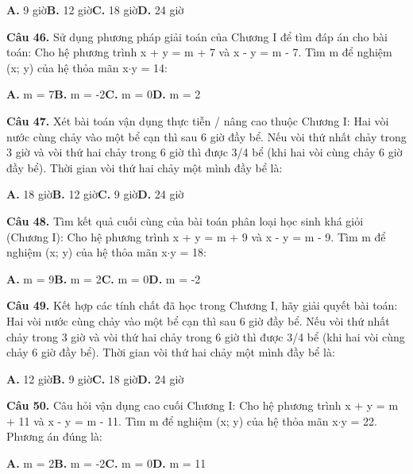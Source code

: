 \documentclass[11pt,a4paper]{article}
\begin{document}
\hspace*{1.5em}\textbf{A.} 9 giờ\quad\quad \textbf{B.} 12 giờ\quad\quad \textbf{C.} 18 giờ\quad\quad \textbf{D.} 24 giờ\par\vspace{2pt}
\textbf{\color{primary} Câu 46.} Sử dụng phương pháp giải toán của Chương I để tìm đáp án cho bài toán: Cho hệ phương trình x + y = m + 7 và x - y = m - 7. Tìm m để nghiệm (x; y) của hệ thỏa mãn x$\cdot$y = 14:\par
\hspace*{1.5em}\textbf{A.} m = 7\quad\quad \textbf{B.} m = -2\quad\quad \textbf{C.} m = 0\quad\quad \textbf{D.} m = 2\par\vspace{2pt}
\textbf{\color{primary} Câu 47.} Xét bài toán vận dụng thực tiễn / nâng cao thuộc Chương I: Hai vòi nước cùng chảy vào một bể cạn thì sau 6 giờ đầy bể. Nếu vòi thứ nhất chảy trong 3 giờ và vòi thứ hai chảy trong 6 giờ thì được 3/4 bể (khi hai vòi cùng chảy 6 giờ đầy bể). Thời gian vòi thứ hai chảy một mình đầy bể là:\par
\hspace*{1.5em}\textbf{A.} 18 giờ\quad\quad \textbf{B.} 12 giờ\quad\quad \textbf{C.} 9 giờ\quad\quad \textbf{D.} 24 giờ\par\vspace{2pt}
\textbf{\color{primary} Câu 48.} Tìm kết quả cuối cùng của bài toán phân loại học sinh khá giỏi (Chương I): Cho hệ phương trình x + y = m + 9 và x - y = m - 9. Tìm m để nghiệm (x; y) của hệ thỏa mãn x$\cdot$y = 18:\par
\hspace*{1.5em}\textbf{A.} m = 9\quad\quad \textbf{B.} m = 2\quad\quad \textbf{C.} m = 0\quad\quad \textbf{D.} m = -2\par\vspace{2pt}
\textbf{\color{primary} Câu 49.} Kết hợp các tính chất đã học trong Chương I, hãy giải quyết bài toán: Hai vòi nước cùng chảy vào một bể cạn thì sau 6 giờ đầy bể. Nếu vòi thứ nhất chảy trong 3 giờ và vòi thứ hai chảy trong 6 giờ thì được 3/4 bể (khi hai vòi cùng chảy 6 giờ đầy bể). Thời gian vòi thứ hai chảy một mình đầy bể là:\par
\hspace*{1.5em}\textbf{A.} 12 giờ\quad\quad \textbf{B.} 9 giờ\quad\quad \textbf{C.} 18 giờ\quad\quad \textbf{D.} 24 giờ\par\vspace{2pt}
\textbf{\color{primary} Câu 50.} Câu hỏi vận dụng cao cuối Chương I: Cho hệ phương trình x + y = m + 11 và x - y = m - 11. Tìm m để nghiệm (x; y) của hệ thỏa mãn x$\cdot$y = 22. Phương án đúng là:\par
\hspace*{1.5em}\textbf{A.} m = 2\quad\quad \textbf{B.} m = -2\quad\quad \textbf{C.} m = 0\quad\quad \textbf{D.} m = 11\par\vspace{2pt}
\end{document}
